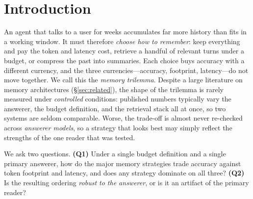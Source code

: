 \documentclass{article} %
\begin{document}
\section{Introduction}
\label{sec:intro}
An agent that talks to a user for weeks accumulates far more history than fits in a
working window. It must therefore \emph{choose how to remember}: keep everything and
pay the token and latency cost, retrieve a handful of relevant turns under a budget,
or compress the past into summaries. Each choice buys accuracy with a different
currency, and the three currencies---accuracy, footprint, latency---do not move
together. We call this the \emph{memory trilemma}. Despite a large literature on
memory architectures (\S\ref{sec:related}), the shape of the trilemma is rarely
measured under \emph{controlled} conditions: published numbers typically vary the
answerer, the budget definition, and the retrieval stack all at once, so two systems
are seldom comparable. Worse, the trade-off is almost never re-checked across
\emph{answerer models}, so a strategy that looks best may simply reflect the strengths
of the one reader that was tested.

We ask two questions. \textbf{(Q1)} Under a single budget definition and a single
primary answerer, how do the major memory strategies trade accuracy against token
footprint and latency, and does any strategy dominate on all three? \textbf{(Q2)} Is
the resulting ordering \emph{robust to the answerer}, or is it an artifact of the
primary reader?
\end{document}
